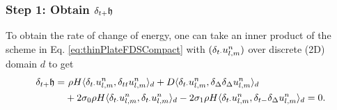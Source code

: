 {\subsubsection{Step 1: Obtain $\delta_{t+} \mathfrak{h}$}
To obtain the rate of change of energy, one can take an inner product of the scheme in Eq. \eqref{eq:thinPlateFDSCompact} with $(\delta_{t\cdot} u_{l,m}^n)$ over discrete (2D) domain $d$ to get
\begin{equation}\label{eq:rOCthinPlate}
    \begin{aligned}
        \delta_{t+} \mathfrak{h} =&\ \rho H \langle \delta_{t\cdot} u_{l,m}^n, \delta_{tt} u_{l,m}^n \rangle_d + D \langle \delta_{t\cdot} u_{l,m}^n, \delta_{\Delta}\delta_{\Delta} u_{l,m}^n \rangle_d\\
        & + 2\sigma_{0}\rho H\langle \delta_{t\cdot} u_{l,m}^n, \delta_{t\cdot} u_{l,m}^n \rangle_d - 2\sigma_{1} \rho H\langle \delta_{t\cdot} u_{l,m}^n, \delta_{t-} \delta_{\Delta} u_{l,m}^n \rangle_d = 0.
    \end{aligned}
\end{equation}

}
